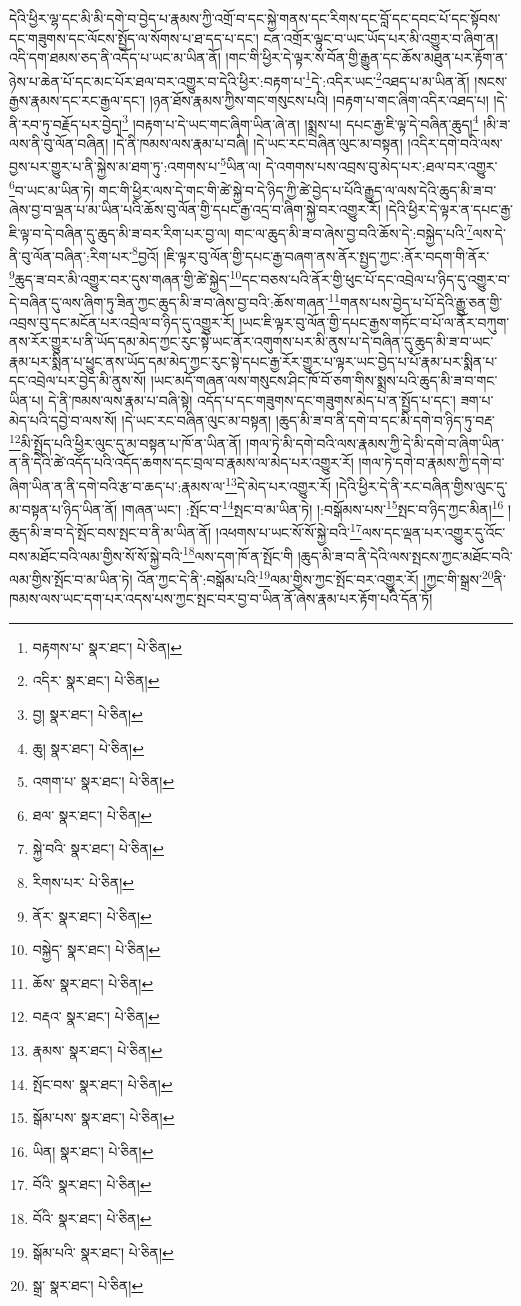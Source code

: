 དེའི་ཕྱིར་ལྷ་དང་མི་མི་དགེ་བ་བྱེད་པ་རྣམས་ཀྱི་འགྲོ་བ་དང་སྐྱེ་གནས་དང་རིགས་དང་བློ་དང་དབང་པོ་དང་སྟོབས་དང་གཟུགས་དང་ལོངས་སྤྱོད་ལ་སོགས་པ་ཐ་དད་པ་དང་། ངན་འགྲོར་ལྟུང་བ་ཡང་ཡོད་པར་མི་འགྱུར་བ་ཞིག་ན། འདི་དག་ཐམས་ཅད་ནི་འདོད་པ་ཡང་མ་ཡིན་ནོ། །གང་གི་ཕྱིར་དེ་ལྟར་ས་བོན་གྱི་རྒྱུན་དང་ཆོས་མཐུན་པར་རྟོག་ན་ཉེས་པ་ཆེན་པོ་དང་མང་པོར་ཐལ་བར་འགྱུར་བ་དེའི་ཕྱིར་:བརྟག་པ་\footnote{བརྟགས་པ་  སྣར་ཐང་།  པེ་ཅིན། }དེ་:འདིར་ཡང་\footnote{འདིར་  སྣར་ཐང་།  པེ་ཅིན། }འཐད་པ་མ་ཡིན་ནོ། །སངས་རྒྱས་རྣམས་དང་རང་རྒྱལ་དང་། །ཉན་ཐོས་རྣམས་ཀྱིས་གང་གསུངས་པའི། །བརྟག་པ་གང་ཞིག་འདིར་འཐད་པ། །དེ་ནི་རབ་ཏུ་བརྗོད་པར་བྱེད།\footnote{བྱ།  སྣར་ཐང་།  པེ་ཅིན། } །བརྟག་པ་དེ་ཡང་གང་ཞིག་ཡིན་ཞེ་ན། །སྨྲས་པ། དཔང་རྒྱ་ཇི་ལྟ་དེ་བཞིན་ཆུད།\footnote{ཆུ།  སྣར་ཐང་།  པེ་ཅིན། } །མི་ཟ་ལས་ནི་བུ་ལོན་བཞིན། །དེ་ནི་ཁམས་ལས་རྣམ་པ་བཞི། །དེ་ཡང་རང་བཞིན་ལུང་མ་བསྟན། །འདིར་དགེ་བའི་ལས་བྱས་པར་གྱུར་པ་ནི་སྐྱེས་མ་ཐག་ཏུ་:འགགས་པ་\footnote{འགག་པ་  སྣར་ཐང་།  པེ་ཅིན། }ཡིན་ལ། དེ་འགགས་པས་འབྲས་བུ་མེད་པར་:ཐལ་བར་འགྱུར་\footnote{ཐལ་  སྣར་ཐང་།  པེ་ཅིན། }བ་ཡང་མ་ཡིན་ཏེ། གང་གི་ཕྱིར་ལས་དེ་གང་གི་ཚེ་སྐྱེ་བ་དེ་ཉིད་ཀྱི་ཚེ་བྱེད་པ་པོའི་རྒྱུད་ལ་ལས་དེའི་ཆུད་མི་ཟ་བ་ཞེས་བྱ་བ་ལྡན་པ་མ་ཡིན་པའི་ཆོས་བུ་ལོན་གྱི་དཔང་རྒྱ་འདྲ་བ་ཞིག་སྐྱེ་བར་འགྱུར་རོ། །དེའི་ཕྱིར་དེ་ལྟར་ན་དཔང་རྒྱ་ཇི་ལྟ་བ་དེ་བཞིན་དུ་ཆུད་མི་ཟ་བར་རིག་པར་བྱ་ལ། གང་ལ་ཆུད་མི་ཟ་བ་ཞེས་བྱ་བའི་ཆོས་དེ་:བསྐྱེད་པའི་\footnote{སྐྱེ་བའི་  སྣར་ཐང་།  པེ་ཅིན། }ལས་དེ་ནི་བུ་ལོན་བཞིན་:རིག་པར་\footnote{རིགས་པར་  པེ་ཅིན། }བྱའོ། །ཇི་ལྟར་བུ་ལོན་གྱི་དཔང་རྒྱ་བཞག་ནས་ནོར་སྤྱད་ཀྱང་:ནོར་བདག་གི་ནོར་\footnote{ནོར་  སྣར་ཐང་།  པེ་ཅིན། }ཆུད་ཟ་བར་མི་འགྱུར་བར་དུས་གཞན་གྱི་ཚེ་སྐྱེད་\footnote{བསྐྱེད་  སྣར་ཐང་།  པེ་ཅིན། }དང་བཅས་པའི་ནོར་གྱི་ཕུང་པོ་དང་འབྲེལ་པ་ཉིད་དུ་འགྱུར་བ་དེ་བཞིན་དུ་ལས་ཞིག་ཏུ་ཟིན་ཀྱང་ཆུད་མི་ཟ་བ་ཞེས་བྱ་བའི་:ཆོས་གཞན་\footnote{ཆོས་  སྣར་ཐང་།  པེ་ཅིན། }གནས་པས་བྱེད་པ་པོ་དེའི་རྒྱུ་ཅན་གྱི་འབྲས་བུ་དང་མངོན་པར་འབྲེལ་བ་ཉིད་དུ་འགྱུར་རོ། །ཡང་ཇི་ལྟར་བུ་ལོན་གྱི་དཔང་རྒྱས་གཏོང་བ་པོ་ལ་ནོར་བཀུག་ནས་རོར་གྱུར་པ་ནི་ཡོད་དམ་མེད་ཀྱང་རུང་སྟེ་ཡང་ནོར་འགུགས་པར་མི་ནུས་པ་དེ་བཞིན་དུ་ཆུད་མི་ཟ་བ་ཡང་རྣམ་པར་སྨིན་པ་ཕྱུང་ནས་ཡོད་དམ་མེད་ཀྱང་རུང་སྟེ་དཔང་རྒྱ་རོར་གྱུར་པ་ལྟར་ཡང་བྱེད་པ་པོ་རྣམ་པར་སྨིན་པ་དང་འབྲེལ་པར་བྱེད་མི་ནུས་སོ། །ཡང་མདོ་གཞན་ལས་གསུངས་ཤིང་ཁོ་བོ་ཅག་གིས་སྨྲས་པའི་ཆུད་མི་ཟ་བ་གང་ཡིན་པ། དེ་ནི་ཁམས་ལས་རྣམ་པ་བཞི་སྟེ། འདོད་པ་དང་གཟུགས་དང་གཟུགས་མེད་པ་ན་སྤྱོད་པ་དང་། ཟག་པ་མེད་པའི་དབྱེ་བ་ལས་སོ། །དེ་ཡང་རང་བཞིན་ལུང་མ་བསྟན། །ཆུད་མི་ཟ་བ་ནི་དགེ་བ་དང་མི་དགེ་བ་ཉིད་ཏུ་བརྡ་\footnote{བརྡའ་  སྣར་ཐང་།  པེ་ཅིན། }མི་སྤྲོད་པའི་ཕྱིར་ལུང་དུ་མ་བསྟན་པ་ཁོ་ན་ཡིན་ནོ། །གལ་ཏེ་མི་དགེ་བའི་ལས་རྣམས་ཀྱི་དེ་མི་དགེ་བ་ཞིག་ཡིན་ན་ནི་དེའི་ཚེ་འདོད་པའི་འདོད་ཆགས་དང་བྲལ་བ་རྣམས་ལ་མེད་པར་འགྱུར་རོ། །གལ་ཏེ་དགེ་བ་རྣམས་ཀྱི་དགེ་བ་ཞིག་ཡིན་ན་ནི་དགེ་བའི་རྩ་བ་ཆད་པ་:རྣམས་ལ་\footnote{རྣམས་  སྣར་ཐང་།  པེ་ཅིན། }དེ་མེད་པར་འགྱུར་རོ། །དེའི་ཕྱིར་དེ་ནི་རང་བཞིན་གྱིས་ལུང་དུ་མ་བསྟན་པ་ཉིད་ཡིན་ནོ། །གཞན་ཡང་། :སྤོང་བ་\footnote{སྤོང་བས་  སྣར་ཐང་།  པེ་ཅིན། }སྤང་བ་མ་ཡིན་ཏེ། །:བསྒོམས་པས་\footnote{སྒོམ་པས་  སྣར་ཐང་།  པེ་ཅིན། }སྤང་བ་ཉིད་ཀྱང་མིན།\footnote{ཡིན།  སྣར་ཐང་།  པེ་ཅིན། } །ཆུད་མི་ཟ་བ་དེ་སྤོང་བས་སྤང་བ་ནི་མ་ཡིན་ནོ། །འཕགས་པ་ཡང་སོ་སོ་སྐྱེ་བའི་\footnote{བོའི་  སྣར་ཐང་།  པེ་ཅིན། }ལས་དང་ལྡན་པར་འགྱུར་དུ་འོང་བས་མཐོང་བའི་ལམ་གྱིས་སོ་སོ་སྐྱེ་བའི་\footnote{བོའི་  སྣར་ཐང་།  པེ་ཅིན། }ལས་དག་ཁོ་ན་སྤོང་གི །ཆུད་མི་ཟ་བ་ནི་དེའི་ལས་སྤངས་ཀྱང་མཐོང་བའི་ལམ་གྱིས་སྤོང་བ་མ་ཡིན་ཏེ། འོན་ཀྱང་དེ་ནི་:བསྒོམ་པའི་\footnote{སྒོམ་པའི་  སྣར་ཐང་།  པེ་ཅིན། }ལམ་གྱིས་ཀྱང་སྤོང་བར་འགྱུར་རོ། །ཀྱང་གི་སྒྲས་\footnote{སྒྲ་  སྣར་ཐང་།  པེ་ཅིན། }ནི་ཁམས་ལས་ཡང་དག་པར་འདས་པས་ཀྱང་སྤང་བར་བྱ་བ་ཡིན་ནོ་ཞེས་རྣམ་པར་རྟོག་པའི་དོན་ཏོ། 